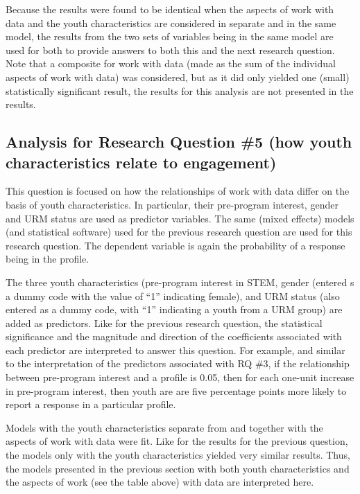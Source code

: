 \documentclass[]{msu-thesis}
\theoremstyle{definition}
\theoremstyle{definition}
\theoremstyle{definition}
\theoremstyle{remark}
\begin{document}
Because the results were found to be identical when the aspects of work
with data and the youth characteristics are considered in separate and
in the same model, the results from the two sets of variables being in
the same model are used for both to provide answers to both this and the
next research question. Note that a composite for work with data (made
as the sum of the individual aspects of work with data) was considered,
but as it did only yielded one (small) statistically significant result,
the results for this analysis are not presented in the results.

\subsection{Analysis for Research Question \#5 (how youth
characteristics relate to
engagement)}\label{analysis-for-research-question-5-how-youth-characteristics-relate-to-engagement}

This question is focused on how the relationships of work with data
differ on the basis of youth characteristics. In particular, their
pre-program interest, gender and URM status are used as predictor
variables. The same (mixed effects) models (and statistical software)
used for the previous research question are used for this research
question. The dependent variable is again the probability of a response
being in the profile.

The three youth characteristics (pre-program interest in STEM, gender
(entered s a dummy code with the value of ``1'' indicating female), and
URM status (also entered as a dummy code, with ``1'' indicating a youth
from a URM group) are added as predictors. Like for the previous
research question, the statistical significance and the magnitude and
direction of the coefficients associated with each predictor are
interpreted to answer this question. For example, and similar to the
interpretation of the predictors associated with RQ \#3, if the
relationship between pre-program interest and a profile is 0.05, then
for each one-unit increase in pre-program interest, then youth are are
five percentage points more likely to report a response in a particular
profile.

Models with the youth characteristics separate from and together with
the aspects of work with data were fit. Like for the results for the
previous question, the models only with the youth characteristics
yielded very similar results. Thus, the models presented in the previous
section with both youth characteristics and the aspects of work (see the
table above) with data are interpreted here.
\end{document}
